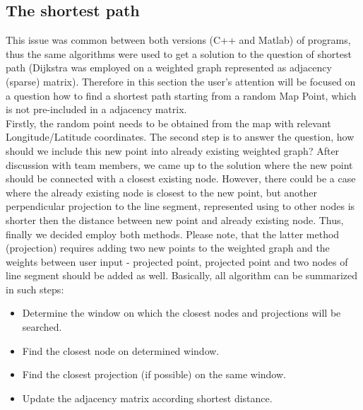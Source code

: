 \documentclass{article}
\begin{document}
\subsection{The shortest path}
This issue was common between both versions (C++ and Matlab) of programs, thus the same algorithms were used to get a solution to the question of shortest path (Dijkstra was employed on a weighted graph represented as adjacency (sparse) matrix). Therefore in this section the user's attention will be focused on a question how to find a shortest path starting from a random Map Point, which is not pre-included in a adjacency matrix.\\
Firstly, the random point needs to be obtained from the map with relevant Longitude/Latitude coordinates. The second step is to answer the question, how should we include this new point into already existing weighted graph? After discussion with team members, we came up to the solution where the new point should be connected with a closest existing node. However, there could be a case where the already existing node is closest to the new point, but another perpendicular projection to the line segment, represented using to other nodes is shorter then the distance between new point and already existing node. Thus, finally we decided employ both methods. Please note, that the latter method (projection) requires adding two new points to the weighted graph and the weights between user input - projected point, projected point and two nodes of line segment should be added as well.
Basically, all algorithm can be summarized in such steps:
\begin{itemize}
\item Determine the window on which the closest nodes and projections will be searched.
\item Find the closest node on determined window.
\item Find the closest projection (if possible) on the same window.
\item Update the adjacency matrix according shortest distance.
\end{itemize}

 
\end{document}
